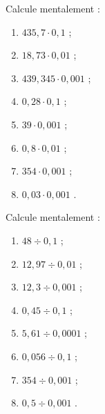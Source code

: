 \begin{exercice}
Calcule mentalement :
\begin{enumerate} 
 \item $435,7 \cdot 0,1$ \dotfill ; 
 
 \item $18,73 \cdot 0,01$ \dotfill ; 
 
 \item $439,345 \cdot 0,001$ \dotfill ; 
 
 \item $0,28 \cdot 0,1$ \dotfill ; 
 
 \item $39 \cdot 0,001$ \dotfill ; 
 
 \item $0,8 \cdot 0,01$ \dotfill ; 
 
 \item $354 \cdot 0,001$ \dotfill ; 
 
 \item $0,03 \cdot 0,001$ \dotfill. 
 
 \end{enumerate}
\end{exercice}

\begin{exercice}
Calcule mentalement :
\begin{enumerate} 
 \item $48 \div 0,1$ \dotfill ; 
 
 \item $12,97 \div 0,01$ \dotfill ; 

 \item $12,3 \div 0,001$ \dotfill ; 
 
 \item $0,45 \div 0,1$ \dotfill ; 
 	
 \item $5,61 \div 0,0001$ \dotfill ; 
 	
 \item $0,056 \div 0,1$ \dotfill ; 
 
 \item $354 \div 0,001$ \dotfill ; 
 
 \item $0,5 \div 0,001$ \dotfill. 

 \end{enumerate}
\end{exercice}


